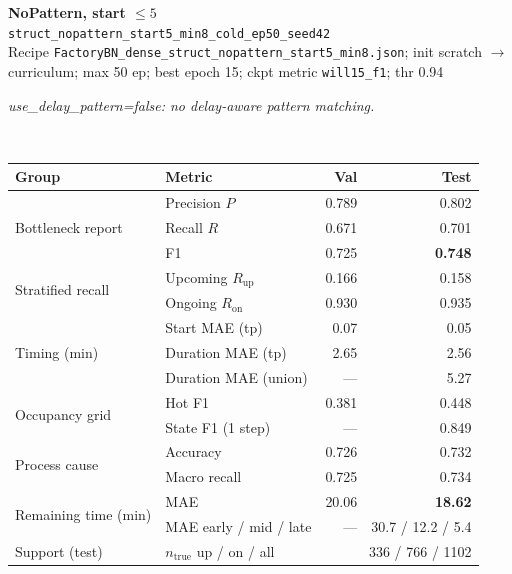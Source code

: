\documentclass[9pt,a4paper,twocolumn]{extarticle}
\begin{document}
\noindent\begin{minipage}{\columnwidth}
\begin{center}
{\small\bfseries NoPattern, start $\le 5$}\\
{\scriptsize\texttt{struct\_nopattern\_start5\_min8\_cold\_ep50\_seed42}}\\
{\scriptsize Recipe \texttt{FactoryBN\_dense\_struct\_nopattern\_start5\_min8.json}; init scratch $\to$ curriculum; max 50 ep; best epoch 15; ckpt metric \texttt{will15\_f1}; thr 0.94}\\[1pt]
\parbox{0.96\columnwidth}{\scriptsize\itshape use\_delay\_pattern=false: no delay-aware pattern matching.}\\[2pt]
\scriptsize\setlength{\tabcolsep}{3pt}
\begin{tabular}{llrr}
\toprule
Group & Metric & Val & Test \\
\midrule
\multirow{3}{*}{Bottleneck report}
  & Precision $P$ & 0.789 & 0.802 \\
  & Recall $R$ & 0.671 & 0.701 \\
  & F1 & 0.725 & \textbf{0.748} \\
\midrule
\multirow{2}{*}{Stratified recall}
  & Upcoming $R_{\mathrm{up}}$ & 0.166 & 0.158 \\
  & Ongoing $R_{\mathrm{on}}$ & 0.930 & 0.935 \\
\midrule
\multirow{3}{*}{Timing (min)}
  & Start MAE (tp) & 0.07 & 0.05 \\
  & Duration MAE (tp) & 2.65 & 2.56 \\
  & Duration MAE (union) & --- & 5.27 \\
\midrule
\multirow{2}{*}{Occupancy grid}
  & Hot F1 & 0.381 & 0.448 \\
  & State F1 (1 step) & --- & 0.849 \\
\midrule
\multirow{2}{*}{Process cause}
  & Accuracy & 0.726 & 0.732 \\
  & Macro recall & 0.725 & 0.734 \\
\midrule
\multirow{2}{*}{Remaining time (min)}
  & MAE & 20.06 & \textbf{18.62} \\
  & MAE early / mid / late & --- & 30.7 / 12.2 / 5.4 \\
\midrule
Support (test)
  & $n_{\mathrm{true}}$ up / on / all & \multicolumn{2}{r}{336 / 766 / 1102} \\
\bottomrule
\end{tabular}
\end{center}
\end{minipage}\par\vspace{6pt}
\end{document}
